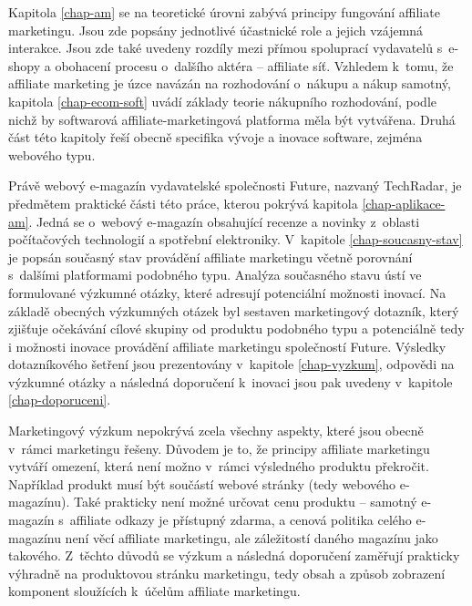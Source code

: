 \documentclass[12pt,twoside,openany]{fithesis}
\begin{document}
Kapitola \hyperlink{chap-am}{{\ref{chap-am}}} se na teoretické úrovni 
zabývá principy fungování affiliate marketingu. Jsou zde popsány 
jednotlivé účastnické role a jejich vzájemná interakce. Jsou zde také 
uvedeny rozdíly mezi přímou spoluprací vydavatelů s~e-shopy a obohacení 
procesu o~dalšího aktéra -- affiliate síť. Vzhledem k~tomu, že affiliate 
marketing je úzce navázán na rozhodování o~nákupu a nákup samotný, 
kapitola \hyperlink{chap-ecom-soft}{{\ref{chap-ecom-soft}}} uvádí základy 
teorie nákupního rozhodování, podle nichž by softwarová 
affiliate-marketingová platforma měla být vytvářena. Druhá část této 
kapitoly řeší obecně specifika vývoje a inovace software, zejména 
webového typu.

Právě webový e-magazín vydavatelské společnosti Future, nazvaný 
TechRadar, je předmětem praktické části této práce, kterou pokrývá 
kapitola \hyperlink{chap-aplikace-am}{{\ref{chap-aplikace-am}}}. Jedná se 
o~webový e-magazín obsahující recenze a novinky z~oblasti počítačových 
technologií a spotřební elektroniky. V~kapitole 
\hyperlink{chap-soucasny-stav}{{\ref{chap-soucasny-stav}}} je popsán 
současný stav provádění affiliate marketingu včetně porovnání 
s~dalšími platformami podobného typu. 
Analýza současného stavu ústí ve formulované výzkumné otázky, které adresují
potenciální možnosti inovací. Na základě obecných výzkumných otázek byl sestaven
marketingový dotazník, který zjišťuje očekávání cílové skupiny od produktu podobného typu
a potenciálně tedy i možnosti inovace provádění affiliate
marketingu společností Future. Výsledky dotazníkového šetření jsou prezentovány 
v~kapitole \hyperlink{chap-vyzkum}{{\ref{chap-vyzkum}}}, odpovědi na výzkumné otázky a
následná doporučení k~inovaci jsou pak uvedeny v~kapitole
\hyperlink{chap-doporuceni}{{\ref{chap-doporuceni}}}.

Marketingový výzkum nepokrývá zcela všechny aspekty, které jsou obecně 
v~rámci marketingu řešeny. Důvodem je to, že principy affiliate marketingu 
vytváří omezení, která není možno v~rámci výsledného produktu 
překročit. Například produkt musí být součástí webové stránky (tedy 
webového e-magazínu). Také prakticky není možné určovat cenu produktu -- 
samotný e-magazín s~affiliate odkazy je přístupný zdarma, a cenová 
politika celého e-magazínu není věcí affiliate marketingu, ale 
záležitostí daného magazínu jako takového. Z~těchto důvodů se výzkum 
a následná doporučení zaměřují prakticky výhradně na produktovou 
stránku marketingu, tedy obsah a způsob zobrazení komponent sloužících 
k~účelům affiliate marketingu.
\end{document}
